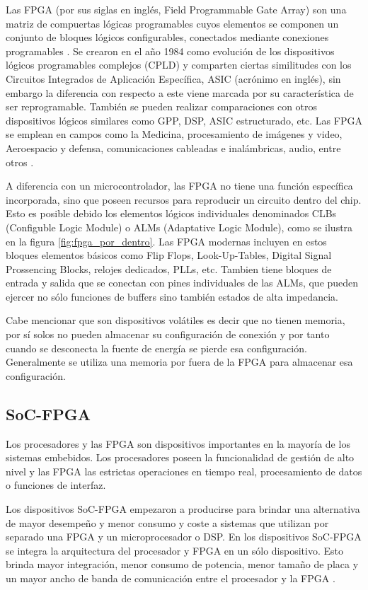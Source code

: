 Las FPGA (por sus siglas en inglés, Field Programmable Gate Array) son una matriz de compuertas lógicas programables cuyos elementos se componen un conjunto de bloques lógicos configurables, conectados mediante conexiones programables \citep{FpgaArq}. Se crearon en el año 1984 como evolución de los dispositivos lógicos programables complejos (CPLD) y comparten ciertas similitudes con los Circuitos Integrados de Aplicación Específica, ASIC (acrónimo en inglés), sin embargo la diferencia con respecto a este viene marcada por su característica de ser reprogramable. También se pueden realizar comparaciones con otros dispositivos lógicos similares como GPP, DSP, ASIC estructurado, etc. Las FPGA se emplean en campos como la Medicina, procesamiento de imágenes y video, Aeroespacio y defensa, comunicaciones cableadas e inalámbricas, audio, entre otros \citep{fpga_xilinx}.

A diferencia con un microcontrolador, las FPGA no tiene una función específica incorporada, sino que poseen recursos para reproducir un circuito dentro del chip. Esto es posible debido los elementos lógicos individuales denominados CLBs (Configuble Logic Module) o  ALMs (Adaptative Logic Module), como se ilustra en la figura \ref{fig:fpga_por_dentro}. Las FPGA modernas incluyen en estos bloques elementos básicos como Flip Flops, Look-Up-Tables, Digital Signal Prossencing Blocks, relojes dedicados, PLLs, etc. Tambien tiene bloques de entrada y salida que se conectan con pines individuales de las ALMs, que pueden ejercer no sólo funciones de buffers sino también estados de alta impedancia.

Cabe mencionar que son dispositivos volátiles es decir que no tienen memoria, por sí solos no pueden almacenar su configuración de conexión y por tanto cuando se desconecta la fuente de energía se pierde esa configuración. Generalmente se utiliza una memoria por fuera de la FPGA para almacenar esa configuración.



\subsection{SoC-FPGA}

Los procesadores y las FPGA son dispositivos importantes en la mayoría de los sistemas embebidos. Los procesadores poseen la funcionalidad de gestión de alto nivel y las FPGA las estrictas operaciones en tiempo real, procesamiento de datos o funciones de interfaz.

Los dispositivos SoC-FPGA empezaron a producirse para brindar una alternativa de mayor desempeño y menor consumo y coste a sistemas que utilizan por separado una FPGA y un microprocesador o DSP. En los dispositivos SoC-FPGA se integra la arquitectura del procesador y FPGA en un sólo dispositivo. Esto brinda mayor integración, menor consumo de potencia, menor tamaño de placa y un mayor ancho de banda de comunicación entre el procesador y la FPGA \citep{soc_fpga}.

